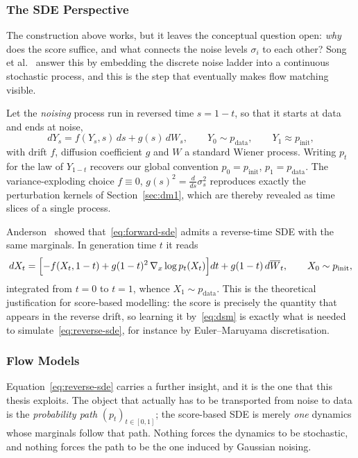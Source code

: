 \documentclass[a4paper,12pt]{article}
\theoremstyle{remark}
\begin{document}
\subsubsection{The SDE Perspective}
\label{sec:dm2}

The construction above works, but it leaves the conceptual question open: \emph{why}
does the score suffice, and what connects the noise levels $\sigma_i$ to each other?
Song et al.~\cite{bortoliRiemannianScoreBasedGenerative2022} answer this by embedding the discrete noise ladder into a
continuous stochastic process, and this is the step that eventually makes flow matching
visible.

Let the \emph{noising} process run in reversed time $s=1-t$, so that it starts at data
and ends at noise,
\begin{equation}
\label{eq:forward-sde}
dY_s=f(Y_s,s)\,ds+g(s)\,dW_s,
\qquad
Y_0\sim p_{\mathrm{data}},
\qquad
Y_1\approx p_{\mathrm{init}},
\end{equation}
with drift $f$, diffusion coefficient $g$ and $W$ a standard Wiener process. Writing
$p_t$ for the law of $Y_{1-t}$ recovers our global convention $p_0=p_{\mathrm{init}}$,
$p_1=p_{\mathrm{data}}$. The variance-exploding choice $f\equiv0$,
$g(s)^2=\tfrac{d}{ds}\sigma_s^2$ reproduces exactly the perturbation kernels of
Section~\ref{sec:dm1}, which are thereby revealed as time slices of a single process.

Anderson~\cite{bortoliRiemannianScoreBasedGenerative2022} showed that~\eqref{eq:forward-sde} admits a reverse-time SDE
with the same marginals. In generation time $t$ it reads
\begin{equation}
\label{eq:reverse-sde}
dX_t
=
\Bigl[
-f(X_t,1-t)
+
g(1-t)^2\,\nabla_x\log p_t(X_t)
\Bigr]dt
+
g(1-t)\,d\overline W_t,
\qquad
X_0\sim p_{\mathrm{init}} ,
\end{equation}
integrated from $t=0$ to $t=1$, whence $X_1\sim p_{\mathrm{data}}$. This is the
theoretical justification for score-based modelling: the score is precisely the
quantity that appears in the reverse drift, so learning it by~\eqref{eq:dsm} is exactly
what is needed to simulate~\eqref{eq:reverse-sde}, for instance by
Euler--Maruyama discretisation.

\subsubsection{Flow Models}
\label{sec:fm}

Equation~\eqref{eq:reverse-sde} carries a further insight, and it is the one that this
thesis exploits. The object that actually has to be transported from noise to data is
the \emph{probability path} $(p_t)_{t\in[0,1]}$; the score-based SDE is merely
\emph{one} dynamics whose marginals follow that path. Nothing forces the dynamics to be
stochastic, and nothing forces the path to be the one induced by Gaussian noising.
\end{document}
